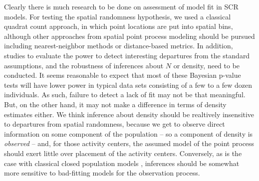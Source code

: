 Clearly there is much research to be done on assessment of  model fit in SCR
models. For testing the spatial randomness hypothesis, we used a
classical quadrat count approach, in which point locations are put
into spatial bins,  although other approaches from
spatial point process modeling should be pursued including
nearest-neighbor methods or distance-based metrics. In addition,
studies to evaluate the power
to detect interesting departures from the standard assumptions,
and the robustness of inferences about $N$ or density,
 need to be conducted.
 It seems reasonable to
expect that most of these Bayesian p-value tests will have lower power
in typical data sets consisting of a few to a few dozen
individuals. As such, failure to detect a lack of fit may not be that
meaningful. But, on the other hand, it may not make a difference in
terms of density estimates either.  We think inference about density
should be realtively insensitive to departures from spatial
randomness, because we get to observe direct information on some
component of the population -- so a component of density is {\it observed}
-- and, for those activity centers, the assumed model of the point
process should exert little over placement of the activity centers.
Conversely, as is the case with classical closed population models
\citep{dorazio_royle:2003, link:2003},
inferences should be somewhat more sensitive to
bad-fitting models for the observation process.












